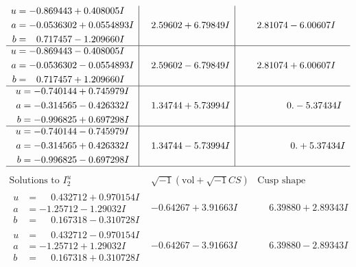 \documentclass[1p]{elsarticle_modified}
\theoremstyle{definition}
\newcommand{\I}{\sqrt{-1}}
\begin{document}
$$\begin{array}{c|c|c}
\begin{aligned}
u &= -0.869443 + 0.408005 I \\
a &= -0.0536302 + 0.0554893 I \\
b &= \phantom{-}0.717457 - 1.209660 I\end{aligned}
 & \phantom{-}2.59602 + 6.79849 I & \phantom{-}2.81074 - 6.00607 I \\ \hline\begin{aligned}
u &= -0.869443 - 0.408005 I \\
a &= -0.0536302 - 0.0554893 I \\
b &= \phantom{-}0.717457 + 1.209660 I\end{aligned}
 & \phantom{-}2.59602 - 6.79849 I & \phantom{-}2.81074 + 6.00607 I \\ \hline\begin{aligned}
u &= -0.740144 + 0.745979 I \\
a &= -0.314565 - 0.426332 I \\
b &= -0.996825 + 0.697298 I\end{aligned}
 & \phantom{-}1.34744 + 5.73994 I & \phantom{-0.000000 } 0. - 5.37434 I \\ \hline\begin{aligned}
u &= -0.740144 - 0.745979 I \\
a &= -0.314565 + 0.426332 I \\
b &= -0.996825 - 0.697298 I\end{aligned}
 & \phantom{-}1.34744 - 5.73994 I & \phantom{-0.000000 -}0. + 5.37434 I\\
 \hline 
 \end{array}$$\newpage$$\begin{array}{c|c|c}  
\text{Solutions to }I^u_{2}& \I (\text{vol} + \sqrt{-1}CS) & \text{Cusp shape}\\
 \hline 
\begin{aligned}
u &= \phantom{-}0.432712 + 0.970154 I \\
a &= -1.25712 - 1.29032 I \\
b &= \phantom{-}0.167318 - 0.310728 I\end{aligned}
 & -0.64267 + 3.91663 I & \phantom{-}6.39880 + 2.89343 I \\ \hline\begin{aligned}
u &= \phantom{-}0.432712 - 0.970154 I \\
a &= -1.25712 + 1.29032 I \\
b &= \phantom{-}0.167318 + 0.310728 I\end{aligned}
 & -0.64267 - 3.91663 I & \phantom{-}6.39880 - 2.89343 I \\ \hline\begin{aligned}

\end{aligned}
\end{array}$$
\end{document}
